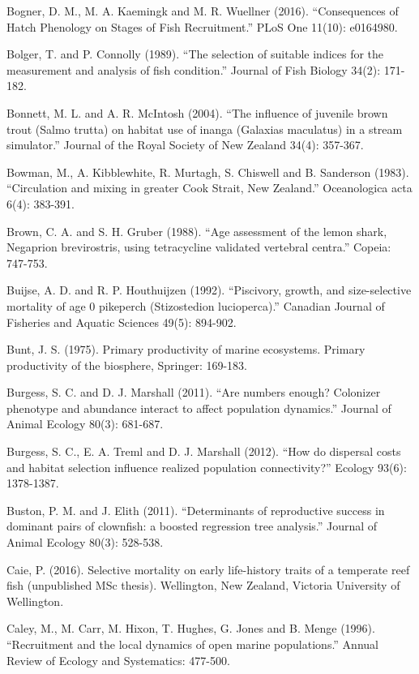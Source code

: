 \documentclass[]{book}
\begin{document}
Bogner, D. M., M. A. Kaemingk and M. R. Wuellner (2016). ``Consequences
of Hatch Phenology on Stages of Fish Recruitment.'' PLoS One 11(10):
e0164980.

Bolger, T. and P. Connolly (1989). ``The selection of suitable indices
for the measurement and analysis of fish condition.'' Journal of Fish
Biology 34(2): 171-182.

Bonnett, M. L. and A. R. McIntosh (2004). ``The influence of juvenile
brown trout (Salmo trutta) on habitat use of inanga (Galaxias maculatus)
in a stream simulator.'' Journal of the Royal Society of New Zealand
34(4): 357-367.

Bowman, M., A. Kibblewhite, R. Murtagh, S. Chiswell and B. Sanderson
(1983). ``Circulation and mixing in greater Cook Strait, New Zealand.''
Oceanologica acta 6(4): 383-391.

Brown, C. A. and S. H. Gruber (1988). ``Age assessment of the lemon
shark, Negaprion brevirostris, using tetracycline validated vertebral
centra.'' Copeia: 747-753.

Buijse, A. D. and R. P. Houthuijzen (1992). ``Piscivory, growth, and
size-selective mortality of age 0 pikeperch (Stizostedion lucioperca).''
Canadian Journal of Fisheries and Aquatic Sciences 49(5): 894-902.

Bunt, J. S. (1975). Primary productivity of marine ecosystems. Primary
productivity of the biosphere, Springer: 169-183.

Burgess, S. C. and D. J. Marshall (2011). ``Are numbers enough?
Colonizer phenotype and abundance interact to affect population
dynamics.'' Journal of Animal Ecology 80(3): 681-687.

Burgess, S. C., E. A. Treml and D. J. Marshall (2012). ``How do
dispersal costs and habitat selection influence realized population
connectivity?'' Ecology 93(6): 1378-1387.

Buston, P. M. and J. Elith (2011). ``Determinants of reproductive
success in dominant pairs of clownfish: a boosted regression tree
analysis.'' Journal of Animal Ecology 80(3): 528-538.

Caie, P. (2016). Selective mortality on early life-history traits of a
temperate reef fish (unpublished MSc thesis). Wellington, New Zealand,
Victoria University of Wellington.

Caley, M., M. Carr, M. Hixon, T. Hughes, G. Jones and B. Menge (1996).
``Recruitment and the local dynamics of open marine populations.''
Annual Review of Ecology and Systematics: 477-500.
\end{document}
